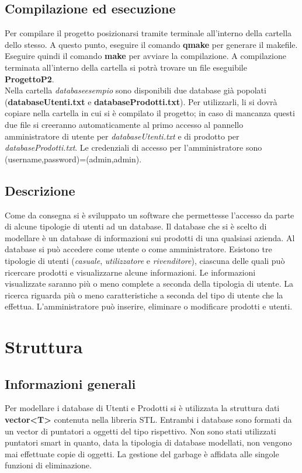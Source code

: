 \documentclass[a4paper,10pt] {article}
\begin{document}
\subsection{Compilazione ed esecuzione}
Per compilare il progetto posizionarsi tramite terminale all'interno della 
cartella dello stesso. A questo punto, eseguire il comando \textbf{qmake} per 
generare
il makefile. Eseguire quindi il comando \textbf{make} per avviare la 
compilazione. A compilazione terminata all'interno della cartella si potrà 
trovare un file 
eseguibile \textbf{ProgettoP2}.\\
Nella cartella \textsl{database\textunderscore esempio} sono disponibili due 
database già popolati 
(\textbf{databaseUtenti.txt} e \textbf{databaseProdotti.txt}). Per utilizzarli, 
li si dovrà copiare nella cartella in cui si è compilato il progetto; in caso 
di 
mancanza questi due file si creeranno automaticamente al primo accesso al 
pannello amministratore di utente per \textsl{databaseUtenti.txt} e di prodotto 
per \textsl{databaseProdotti.txt}.
Le credenziali di accesso per l'amministratore sono 
(username,password)=(admin,admin).

\subsection{Descrizione}
Come da consegna si è sviluppato un software che permettesse l'accesso da parte 
di alcune tipologie di utenti ad un database. Il database che si è scelto di 
modellare è un database di informazioni sui prodotti di una qualsiasi azienda. 
Al database si può accedere come utente o come amministratore. Esistono tre 
tipologie di utenti (\textsl{casuale}, \textsl{utilizzatore} e 
\textsl{rivenditore}),
ciascuna delle quali può
ricercare prodotti e visualizzarne alcune informazioni. Le 
informazioni visualizzate saranno più o meno complete a seconda della tipologia
di utente. La ricerca riguarda più o meno caratteristiche a seconda del tipo di 
utente che la effettua. L'amministratore può inserire, eliminare o modificare 
prodotti e 
utenti.

\newpage

\section{Struttura}

\subsection{Informazioni generali}
Per modellare i database di Utenti e Prodotti si è utilizzata la struttura dati 
\textbf{vector<T>} contenuta nella libreria STL. Entrambi i database sono 
formati
da un vector di puntatori a oggetti del tipo rispettivo. Non sono stati 
utilizzati puntatori smart in quanto, data la tipologia di database modellati, 
non vengono
mai effettuate copie di oggetti. La gestione del garbage è affidata alle 
singole 
funzioni di eliminazione.
\end{document}
